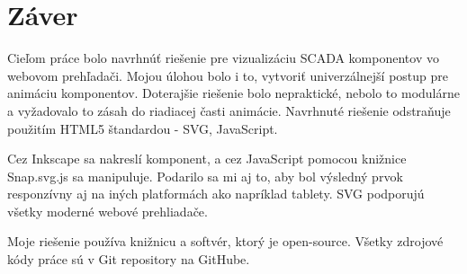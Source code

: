 \chapter*{Záver}

Cieľom práce bolo navrhnúť riešenie pre vizualizáciu SCADA komponentov vo webovom prehľadači. Mojou úlohou bolo i to, vytvoriť univerzálnejší postup pre animáciu komponentov.  Doterajšie riešenie bolo nepraktické, nebolo to modulárne a vyžadovalo to  zásah do riadiacej časti animácie. Navrhnuté riešenie odstraňuje použitím HTML5 štandardou - SVG, JavaScript. 

Cez Inkscape sa nakreslí komponent, a cez JavaScript pomocou knižnice Snap.svg.js sa manipuluje. Podarilo sa mi aj to, aby bol výsledný prvok responzívny aj na iných platformách ako napríklad tablety. SVG podporujú všetky moderné webové prehliadače.

Moje riešenie používa knižnicu a softvér, ktorý je open-source. Všetky zdrojové kódy práce sú v Git repository na GitHube.